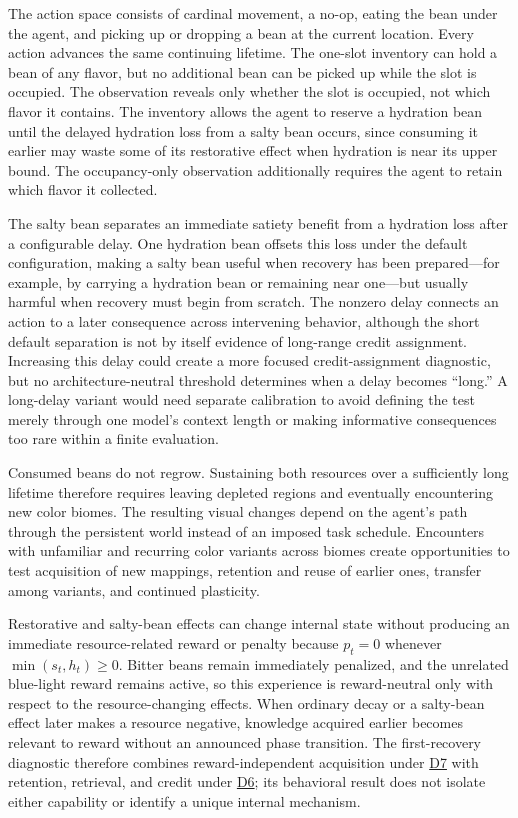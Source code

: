 \documentclass[10pt,journal,compsoc]{IEEEtran}
\DeclareRobustCommand{\Dref}[1]{\hyperref[sec:d#1]{D#1}}
\begin{document}
The action space consists of cardinal movement, a no-op, eating the bean under the agent, and picking up or dropping a bean at the current location.
Every action advances the same continuing lifetime.
The one-slot inventory can hold a bean of any flavor, but no additional bean can be picked up while the slot is occupied.
The observation reveals only whether the slot is occupied, not which flavor it contains.
The inventory allows the agent to reserve a hydration bean until the delayed hydration loss from a salty bean occurs, since consuming it earlier may waste some of its restorative effect when hydration is near its upper bound.
The occupancy-only observation additionally requires the agent to retain which flavor it collected.

The salty bean separates an immediate satiety benefit from a hydration loss after a configurable delay.
One hydration bean offsets this loss under the default configuration, making a salty bean useful when recovery has been prepared---for example, by carrying a hydration bean or remaining near one---but usually harmful when recovery must begin from scratch.
The nonzero delay connects an action to a later consequence across intervening behavior, although the short default separation is not by itself evidence of long-range credit assignment.
Increasing this delay could create a more focused credit-assignment diagnostic, but no architecture-neutral threshold determines when a delay becomes ``long.''
A long-delay variant would need separate calibration to avoid defining the test merely through one model's context length or making informative consequences too rare within a finite evaluation.

Consumed beans do not regrow.
Sustaining both resources over a sufficiently long lifetime therefore requires leaving depleted regions and eventually encountering new color biomes.
The resulting visual changes depend on the agent's path through the persistent world instead of an imposed task schedule.
Encounters with unfamiliar and recurring color variants across biomes create opportunities to test acquisition of new mappings, retention and reuse of earlier ones, transfer among variants, and continued plasticity.

Restorative and salty-bean effects can change internal state without producing an immediate resource-related reward or penalty because $p_t=0$ whenever $\min(s_t,h_t)\geq 0$.
Bitter beans remain immediately penalized, and the unrelated blue-light reward remains active, so this experience is reward-neutral only with respect to the resource-changing effects.
When ordinary decay or a salty-bean effect later makes a resource negative, knowledge acquired earlier becomes relevant to reward without an announced phase transition.
The first-recovery diagnostic therefore combines reward-independent acquisition under \Dref{7} with retention, retrieval, and credit under \Dref{6}; its behavioral result does not isolate either capability or identify a unique internal mechanism.
\end{document}
